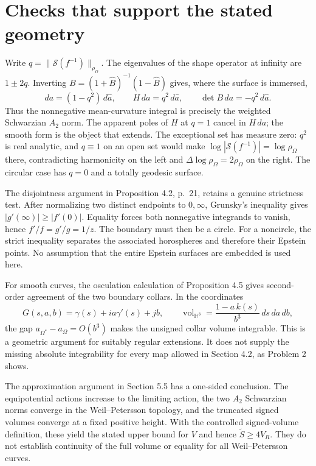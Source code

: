 \documentclass[10pt]{article}
\begin{document}
\section*{Checks that support the stated geometry}
Write \(q=\|\mathcal S(f^{-1})\|_{\rho_\Omega}\). The eigenvalues of the shape operator at infinity are \(1\pm2q\). Inverting \(B=(1+\widehat B)^{-1}(1-\widehat B)\) gives, where the surface is immersed, \[da=(1-q^2)\,d\widehat a,\qquad
 H\,da=q^2\,d\widehat a,\qquad
 \det B\,da=-q^2\,d\widehat a .\] Thus the nonnegative mean-curvature integral is precisely the weighted Schwarzian \(A_2\) norm. The apparent poles of \(H\) at \(q=1\) cancel in \(H\,da\); the smooth form is the object that extends. The exceptional set has measure zero: \(q^2\) is real analytic, and \(q\equiv1\) on an open set would make \(\log|\mathcal S(f^{-1})|=\log\rho_\Omega\) there, contradicting harmonicity on the left and \(\Delta\log\rho_\Omega=2\rho_\Omega\) on the right. The circular case has \(q=0\) and a totally geodesic surface.\par
The disjointness argument in Proposition 4.2, p. 21, retains a genuine strictness test. After normalizing two distinct endpoints to \(0,\infty\), Grunsky’s inequality gives \(|g'(\infty)|\geq|f'(0)|\). Equality forces both nonnegative integrands to vanish, hence \(f'/f=g'/g=1/z\). The boundary must then be a circle. For a noncircle, the strict inequality separates the associated horospheres and therefore their Epstein points. No assumption that the entire Epstein surfaces are embedded is used here.\par
For smooth curves, the osculation calculation of Proposition 4.5 gives second-order agreement of the two boundary collars. In the coordinates \[G(s,a,b)=\gamma(s)+ia\gamma'(s)+jb,
 \qquad
 \operatorname{vol}_{\mathbb H^3}=\frac{1-a\,k(s)}{b^3}\,ds\,da\,db ,\] the gap \(a_{\Omega^*}-a_\Omega=O(b^3)\) makes the unsigned collar volume integrable. This is a geometric argument for suitably regular extensions. It does not supply the missing absolute integrability for every map allowed in Section 4.2, as Problem 2 shows.\par
The approximation argument in Section 5.5 has a one-sided conclusion. The equipotential actions increase to the limiting action, the two \(A_2\) Schwarzian norms converge in the Weil–Petersson topology, and the truncated signed volumes converge at a fixed positive height. With the controlled signed-volume definition, these yield the stated upper bound for \(V\) and hence \(\widetilde S\geq4V_R\). They do not establish continuity of the full volume or equality for all Weil–Petersson curves.\par
\end{document}
